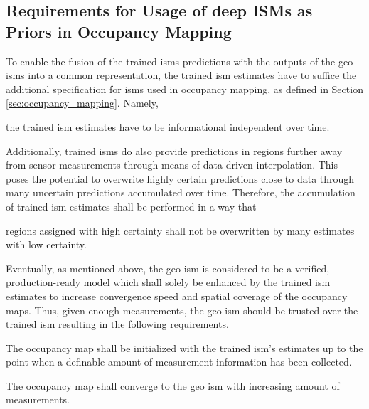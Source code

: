\subsection{Requirements for Usage of deep ISMs as Priors in Occupancy Mapping}
\label{subsec:requirements_for_usage_of_deep_ims_as_priors_in_occmapping}
To enable the fusion of the trained \gls{ism}s predictions with the outputs of the geo \gls{ism}s into a common representation, the trained \gls{ism} estimates have to suffice the additional specification for \gls{ism}s used in occupancy mapping, as defined in Section \ref{sec:occupancy_mapping}. Namely,
\\
\setcounter{req}{2}
\setcounter{subreq}{0}
\begin{subreq} \label{subreq:indep_info}
	the trained \gls{ism} estimates have to be informational independent over time.
\end{subreq}
Additionally, trained \gls{ism}s do also provide predictions in regions further away from sensor measurements through means of data-driven interpolation. This poses the potential to overwrite highly certain predictions close to data through many uncertain predictions accumulated over time. Therefore, the accumulation of trained \gls{ism} estimates shall be performed in a way that
\\
\begin{subreq} \label{subreq:no_falsification}
	regions assigned with high certainty shall not be overwritten by many estimates with low certainty. 
\end{subreq}
Eventually, as mentioned above, the geo \gls{ism} is considered to be a verified, production-ready model which shall solely be enhanced by the trained \gls{ism} estimates to increase convergence speed and spatial coverage of the occupancy maps. Thus, given enough measurements, the geo \gls{ism} should be trusted over the trained \gls{ism} resulting in the following requirements.
\\
\begin{subreq} \label{subreq:initialize_with_deep_ism}
	The occupancy map shall be initialized with the trained \gls{ism}'s estimates up to the point when a definable amount of measurement information has been collected.
\end{subreq}
\vspace{\baselineskip}
\begin{subreq} \label{subreq:converge_to_geo_ism}
	The occupancy map shall converge to the geo \gls{ism} with increasing amount of measurements.
\end{subreq}
%
